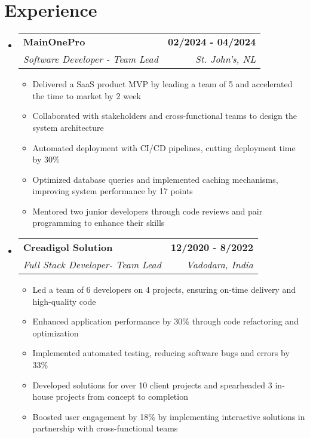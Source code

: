 \documentclass[letterpaper,11pt]{article}
\makeatletter
\newcommand{\resumeItem}[1]{
  \item\small{
    {#1 \vspace{-2pt}}
  }
}
\newcommand{\resumeSubheading}[4]{
  \vspace{-2pt}\item
    \begin{tabular*}{1.0\textwidth}[t]{l@{\extracolsep{\fill}}r}
      \textbf{#1} & \textbf{\small #2} \\
      \textit{\small#3} & \textit{\small #4} \\
    \end{tabular*}\vspace{-7pt}
}
\newcommand{\resumeSubHeadingListStart}{\begin{itemize}[leftmargin=0.0in, label={}]}
\newcommand{\resumeSubHeadingListEnd}{\end{itemize}}
\newcommand{\resumeItemListStart}{\begin{itemize}}
\newcommand{\resumeItemListEnd}{\end{itemize}\vspace{-5pt}}
\makeatother
\begin{document}
\section{Experience}
  \resumeSubHeadingListStart
    \resumeSubheading
      {MainOnePro}{02/2024 - 04/2024}
      {Software Developer - Team Lead}{St. John's, NL}
      \resumeItemListStart
        \resumeItem{Delivered a SaaS product MVP by leading a team of 5 and accelerated the time to market by 2 week}
        \resumeItem{Collaborated with stakeholders and cross-functional teams to design the system architecture}
        \resumeItem{Automated deployment with CI/CD pipelines, cutting deployment time by 30\%}
        \resumeItem{Optimized database queries and implemented caching mechanisms, improving system performance by 17 points}
        \resumeItem{Mentored two junior developers through code reviews and pair programming to enhance their skills}
      \resumeItemListEnd
    \resumeSubheading
      {Creadigol Solution}{12/2020 - 8/2022}
      {Full Stack Developer- Team Lead}{Vadodara, India}
      \resumeItemListStart
        \resumeItem{Led a team of 6 developers on 4 projects, ensuring on-time delivery and high-quality code}
        \resumeItem{Enhanced application performance by 30\% through code refactoring and optimization}
        \resumeItem{Implemented automated testing, reducing software bugs and errors by 33\%}
        \resumeItem{Developed solutions for over 10 client projects and spearheaded 3 in-house projects from concept to completion}
        \resumeItem{Boosted user engagement by 18\% by implementing interactive solutions in partnership with cross-functional teams}
      \resumeItemListEnd
  \resumeSubHeadingListEnd
\vspace{-16pt}
\end{document}
